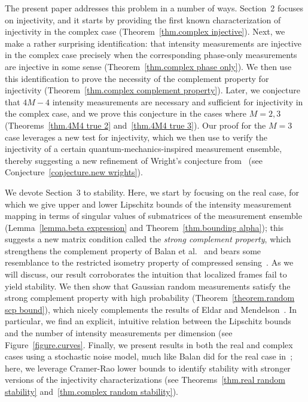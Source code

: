 \documentclass[times,10pt]{elsarticle}
\theoremstyle{plain}
\begin{document}
The present paper addresses this problem in a number of ways.
Section~2 focuses on injectivity, and it starts by providing the first known characterization of injectivity in the complex case (Theorem~\ref{thm.complex injective}).
Next, we make a rather surprising identification: that intensity measurements are injective in the complex case precisely when the corresponding phase-only measurements are injective in some sense (Theorem~\ref{thm.complex phase only}).
We then use this identification to prove the necessity of the complement property for injectivity (Theorem~\ref{thm.complex complement property}).
Later, we conjecture that $4M-4$ intensity measurements are necessary and sufficient for injectivity in the complex case, and we prove this conjecture in the cases where $M=2,3$ (Theorems~\ref{thm.4M4 true 2} and~\ref{thm.4M4 true 3}).
Our proof for the $M=3$ case leverages a new test for injectivity, which we then use to verify the injectivity of a certain quantum-mechanics-inspired measurement ensemble, thereby suggesting a new refinement of Wright's conjecture from~\cite{Vogt:78} (see Conjecture~\ref{conjecture.new wrights}). 

We devote Section~3 to stability.
Here, we start by focusing on the real case, for which we give upper and lower Lipschitz bounds of the intensity measurement mapping in terms of singular values of submatrices of the measurement ensemble (Lemma~\ref{lemma.beta expression} and Theorem~\ref{thm.bounding alpha}); this suggests a new matrix condition called the \textit{strong complement property}, which strengthens the complement property of Balan et al.~\cite{BalanCE:06} and bears some resemblance to the restricted isometry property of compressed sensing~\cite{Candes:08}.
As we will discuss, our result corroborates the intuition that localized frames fail to yield stability.
We then show that Gaussian random measurements satisfy the strong complement property with high probability (Theorem~\ref{theorem.random scp bound}), which nicely complements the results of Eldar and Mendelson~\cite{EldarM:12}.
In particular, we find an explicit, intuitive relation between the Lipschitz bounds and the number of intensity measurements per dimension (see Figure~\ref{figure.curves}.
Finally, we present results in both the real and complex cases using a stochastic noise model, much like Balan did for the real case in~\cite{Balan:12}; here, we leverage Cramer-Rao lower bounds to identify stability with stronger versions of the injectivity characterizations (see Theorems~\ref{thm.real random stability} and~\ref{thm.complex random stability}).
\end{document}
